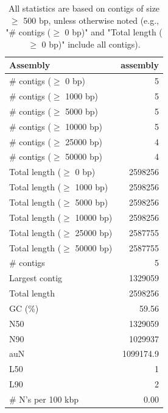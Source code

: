 \documentclass[12pt,a4paper]{article}
\begin{document}
\begin{table}[ht]
\begin{center}
\caption{All statistics are based on contigs of size $\geq$ 500 bp, unless otherwise noted (e.g., "\# contigs ($\geq$ 0 bp)" and "Total length ($\geq$ 0 bp)" include all contigs).}
\begin{tabular}{|l*{1}{|r}|}
\hline
Assembly & assembly \\ \hline
\# contigs ($\geq$ 0 bp) & 5 \\ \hline
\# contigs ($\geq$ 1000 bp) & 5 \\ \hline
\# contigs ($\geq$ 5000 bp) & 5 \\ \hline
\# contigs ($\geq$ 10000 bp) & 5 \\ \hline
\# contigs ($\geq$ 25000 bp) & 4 \\ \hline
\# contigs ($\geq$ 50000 bp) & 4 \\ \hline
Total length ($\geq$ 0 bp) & 2598256 \\ \hline
Total length ($\geq$ 1000 bp) & 2598256 \\ \hline
Total length ($\geq$ 5000 bp) & 2598256 \\ \hline
Total length ($\geq$ 10000 bp) & 2598256 \\ \hline
Total length ($\geq$ 25000 bp) & 2587755 \\ \hline
Total length ($\geq$ 50000 bp) & 2587755 \\ \hline
\# contigs & 5 \\ \hline
Largest contig & 1329059 \\ \hline
Total length & 2598256 \\ \hline
GC (\%) & 59.56 \\ \hline
N50 & 1329059 \\ \hline
N90 & 1029937 \\ \hline
auN & 1099174.9 \\ \hline
L50 & 1 \\ \hline
L90 & 2 \\ \hline
\# N's per 100 kbp & 0.00 \\ \hline
\end{tabular}
\end{center}
\end{table}
\end{document}
